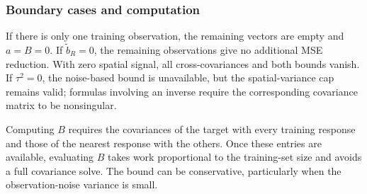 \subsubsection{Boundary cases and computation}
\label{sec:bound-cases}
If there is only one training observation, the remaining vectors are empty and $a=B=0$. If $\widetilde b_R=0$, the remaining observations give no additional MSE reduction. With zero spatial signal, all cross-covariances and both bounds vanish. If $\tau^2=0$, the noise-based bound is unavailable, but the spatial-variance cap remains valid; formulas involving an inverse require the corresponding covariance matrix to be nonsingular.

Computing $B$ requires the covariances of the target with every training response and those of the nearest response with the others. Once these entries are available, evaluating $B$ takes work proportional to the training-set size and avoids a full covariance solve. The bound can be conservative, particularly when the observation-noise variance is small.
